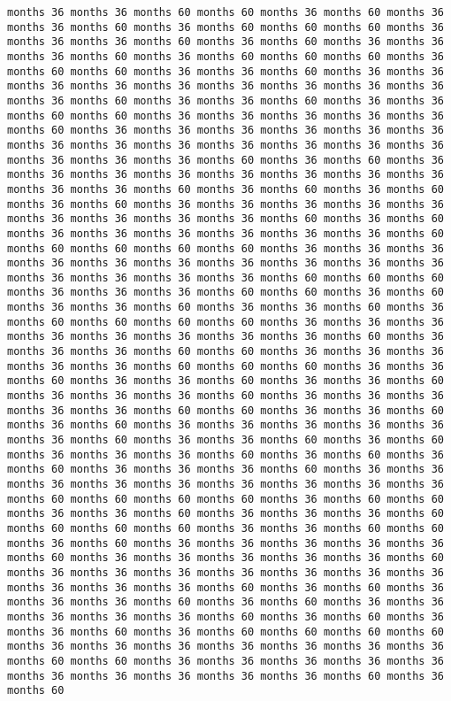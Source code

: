 \documentclass[11pt]{article}
\begin{document}
\begin{Verbatim}[commandchars=\\\{\}, frame=single, framerule=2mm, rulecolor=\color{outerrorbackground}]
months 36 months 36 months 60 months 60 months 36 months 60 months 36 months 36 months 60 months 36 months 60 months 60 months 60 months 36 months 36 months 36 months 60 months 36 months 60 months 36 months 36 months 36 months 60 months 36 months 60 months 60 months 60 months 36 months 60 months 60 months 36 months 36 months 60 months 36 months 36 months 36 months 36 months 36 months 36 months 36 months 36 months 36 months 36 months 60 months 36 months 36 months 60 months 36 months 36 months 60 months 60 months 36 months 36 months 36 months 36 months 36 months 60 months 36 months 36 months 36 months 36 months 36 months 36 months 36 months 36 months 36 months 36 months 36 months 36 months 36 months 36 months 36 months 36 months 60 months 36 months 60 months 36 months 36 months 36 months 36 months 36 months 36 months 36 months 36 months 36 months 36 months 60 months 36 months 60 months 36 months 60 months 36 months 60 months 36 months 36 months 36 months 36 months 36 months 36 months 36 months 36 months 36 months 60 months 36 months 60 months 36 months 36 months 36 months 36 months 36 months 36 months 60 months 60 months 60 months 60 months 60 months 36 months 36 months 36 months 36 months 36 months 36 months 36 months 36 months 36 months 36 months 36 months 36 months 36 months 36 months 60 months 60 months 60 months 36 months 36 months 36 months 60 months 60 months 36 months 60 months 36 months 36 months 60 months 36 months 36 months 60 months 36 months 60 months 60 months 60 months 60 months 36 months 36 months 36 months 36 months 36 months 36 months 36 months 36 months 60 months 36 months 36 months 36 months 60 months 60 months 36 months 36 months 36 months 36 months 36 months 60 months 60 months 60 months 36 months 36 months 60 months 36 months 36 months 60 months 36 months 36 months 60 months 36 months 36 months 36 months 60 months 36 months 36 months 36 months 36 months 36 months 60 months 60 months 36 months 36 months 60 months 36 months 60 months 36 months 36 months 36 months 36 months 36 months 36 months 60 months 36 months 36 months 60 months 36 months 60 months 36 months 36 months 36 months 60 months 36 months 60 months 36 months 60 months 36 months 36 months 36 months 60 months 36 months 36 months 36 months 36 months 36 months 36 months 36 months 36 months 36 months 60 months 60 months 60 months 60 months 36 months 60 months 60 months 36 months 36 months 60 months 36 months 36 months 36 months 60 months 60 months 60 months 60 months 36 months 36 months 60 months 60 months 36 months 60 months 36 months 36 months 36 months 36 months 36 months 60 months 36 months 36 months 36 months 36 months 36 months 60 months 36 months 36 months 36 months 36 months 36 months 36 months 36 months 36 months 36 months 36 months 60 months 36 months 60 months 36 months 36 months 36 months 60 months 36 months 60 months 36 months 36 months 36 months 36 months 36 months 60 months 36 months 60 months 36 months 36 months 60 months 36 months 60 months 60 months 60 months 60 months 36 months 36 months 36 months 36 months 36 months 36 months 36 months 60 months 60 months 36 months 36 months 36 months 36 months 36 months 36 months 36 months 36 months 36 months 36 months 60 months 36 months 60 
\end{Verbatim}
\end{document}

